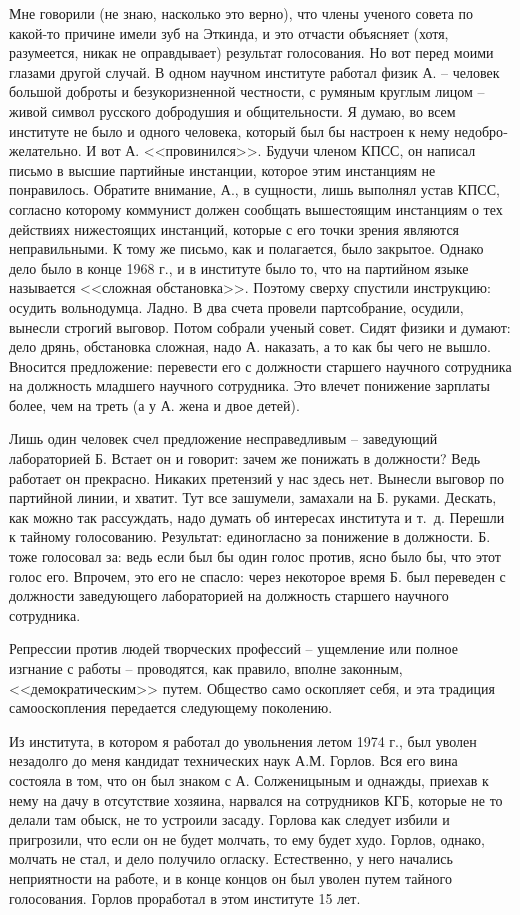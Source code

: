 \documentclass{book}
\begin{document}
Мне говорили (не знаю, насколько это верно), что члены ученого совета по какой-то причине имели зуб на Эткинда, и это отчасти объясняет (хотя, разумеется, никак не оправды­вает) результат голосования. Но вот перед моими глазами другой случай. В одном научном институте работал физик А. -- человек большой доброты и безукоризненной честности, с ру­мяным круглым лицом -- живой символ русского доброду­шия и общительности. Я думаю, во всем институте не было и одного человека, который был бы настроен к нему недобро­желательно. И вот А. <<провинился>>. Будучи членом КПСС, он написал письмо в высшие партийные инстанции, которое этим инстанциям не понравилось. Обратите внимание, А., в сущ­ности, лишь выполнял устав КПСС, согласно которому комму­нист должен сообщать вышестоящим инстанциям о тех дейст­виях нижестоящих инстанций, которые с его точки зрения являются неправильными. К тому же письмо, как и полагает­ся, было закрытое. Однако дело было в конце 1968 г., и в институте было то, что на партийном языке называется 
<<слож­ная обстановка>>. Поэтому сверху спустили инструкцию: осу­дить вольнодумца. Ладно. В два счета провели партсобрание, осудили, вынесли строгий выговор. Потом собрали ученый со­вет. Сидят физики и думают: дело дрянь, обстановка сложная, надо А. наказать, а то как бы чего не вышло. Вносится предло­жение: перевести его с должности старшего научного сотруд­ника на должность младшего научного сотрудника. Это вле­чет понижение зарплаты более, чем на треть (а у А. жена и двое детей).

Лишь один человек счел предложение несправедливым -- заведующий лабораторией Б. Встает он и говорит: зачем же понижать в должности? Ведь работает он прекрасно. Никаких претензий у нас здесь нет. Вынесли выговор по партийной линии, и хватит.
Тут все зашумели, замахали на Б. руками. Дескать, как можно так рассуждать, надо думать об интересах института и т.~д. Перешли к тайному голосованию. Результат: единогласно за понижение в должности. Б. тоже голосовал за:  ведь если был бы один голос против, ясно было бы, что этот голос его. Впрочем, это его не спасло: через некоторое время Б. был переведен с должности заведующего лабораторией на должность старшего научного сотрудника.

Репрессии против людей творческих профессий -- ущемление или полное изгнание с работы -- проводятся, как правило, вполне законным, <<демократическим>> путем. Общество само оскопляет себя, и эта традиция самооскопления передается следующему поколению.

Из института, в котором я работал до увольнения летом 1974 г., был уволен незадолго до меня кандидат технических наук А.М. Горлов. Вся его вина состояла в том, что он был знаком с А. Солженицыным и однажды, приехав к нему на дачу в отсутствие хозяина, нарвался на сотрудников КГБ, которые не то делали там обыск, не то устроили засаду. Горлова как следует избили и пригрозили, что если он не будет молчать, то ему будет худо. Горлов, однако, молчать не стал, и дело получило огласку. Естественно, у него начались неприятности на работе, и в конце концов он был уволен путем тайного голосования. Горлов проработал в этом институте 15 лет.
\end{document}
